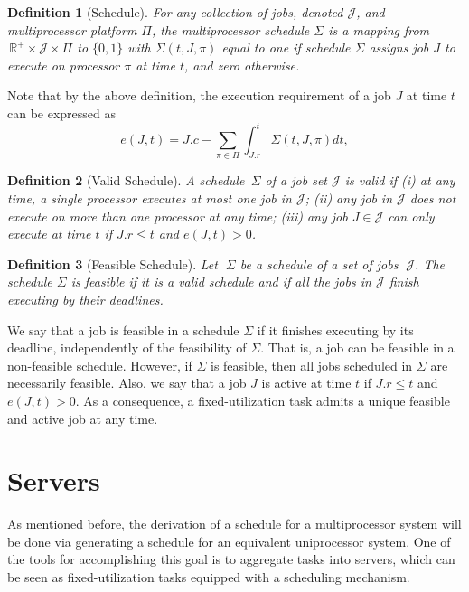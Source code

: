 \documentclass[twocolumn, compsocconf]{IEEEtran}
\newtheorem{definition}{Definition}[section]
\renewcommand{\leq}{\leqslant}
\newcommand{\Real}{\ensuremath{\mathbb{R}}\xspace}
\newcommand{\sched}{\ensuremath{\Sigma}\xspace}
\newcommand{\jobSet}{\ensuremath{\mathcal{J}}}
\newcommand{\procSet}{\ensuremath{\Pi}\xspace}
\newcounter{proc}
\begin{document}
\begin{definition}[Schedule]
  For any collection of jobs, denoted $\jobSet$, and multiprocessor platform
  $\procSet$, the multiprocessor schedule $\sched$ is a mapping from $\,\Real^+
  \times \jobSet \times \procSet$ to $\{0, 1\}$ with $\sched(t, J, \pi)$ equal
  to one if schedule $\sched$ assigns job $J$ to execute on processor $\pi$ at
  time $t$, and zero otherwise.
\end{definition}

Note that by the above definition, the execution requirement of a job $J$ at
time $t$ can be expressed as
\[
e(J,t) = J.c - \sum_{\pi \in \procSet} \int_{J.r}^t \sched(t, J, \pi) dt,
\]

\begin{definition}[Valid Schedule]
  A schedule $\,\sched$ of a job set $\jobSet$ is valid if (i) at any time, a
  single processor executes at most one job in $\jobSet$; (ii) any job in
  $\jobSet$ does not execute on more than one processor at any time; (iii) any
  job $J \in \jobSet$ can only execute at time $t$ if $J.r \leq t$ and $e(J,t) >
  0$.
\end{definition}

\begin{definition}[Feasible Schedule]
  Let $\;\sched$ be a schedule of a set of jobs $\;\jobSet$. The schedule
  $\sched$ is feasible if it is a valid schedule and if all the jobs in
  $\jobSet$ finish executing by their deadlines.
\end{definition}

We say that a job is feasible in a schedule $\sched$ if it finishes executing by
its deadline, independently of the feasibility of $\sched$. That is, a job can
be feasible in a non-feasible schedule. However, if $\sched$ is feasible, then
all jobs scheduled in $\sched$ are necessarily feasible. Also, we say that a job
$J$ is active at time $t$ if $J.r \leq t$ and $e(J,t) > 0$.  As a
consequence, a fixed-utilization task admits a unique feasible and active job at
any time.



\section{Servers}\label{sec:server}

As mentioned before, the derivation of a schedule for a multiprocessor system will
be done via generating a schedule for an equivalent uniprocessor system. One of
the tools for accomplishing this goal is to aggregate tasks into servers, which
can be seen as fixed-utilization tasks equipped with a scheduling mechanism.
\end{document}
